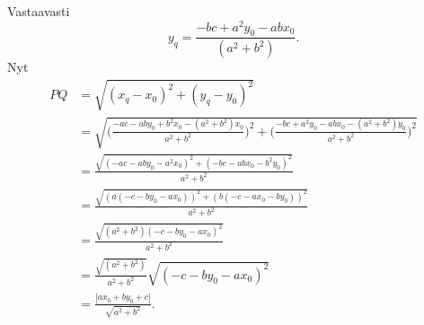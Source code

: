 Vastaavasti
\[
y_q = \frac{-bc+a^2y_0-abx_0}{(a^2+b^2)}.
\]
Nyt
\begin{align*}
PQ &= \sqrt{(x_q-x_0)^2+(y_q-y_0)^2} \\
&= \sqrt{\Big(\frac{-ac-aby_0+b^2x_0-(a^2+b^2)x_0}{a^2+b^2}\Big)^2+\Big(\frac{-bc+a^2y_0-abx_0-(a^2+b^2)y_0}{a^2+b^2}\Big)^2} \\
& = \frac{\sqrt{(-ac-aby_0-a^2x_0)^2+(-bc-abx_0-b^2 y_0)^2}}{a^2+b^2} \\
& = \frac{\sqrt{(a(-c-by_0-ax_0))^2+(b(-c-ax_0-by_0))^2}}{a^2+b^2} \\
& = \frac{\sqrt{(a^2+b^2)(-c-by_0-ax_0)^2}}{a^2+b^2} \\
& = \frac{\sqrt{(a^2+b^2)}}{a^2+b^2}\sqrt{(-c-by_0-ax_0)^2} \\
& = \frac{|ax_0+by_0+c|}{\sqrt{a^2+b^2}}.
\end{align*}
